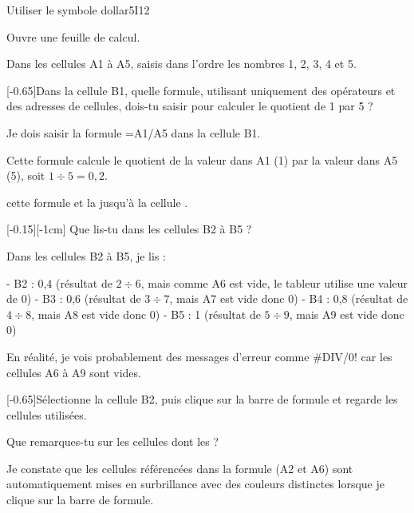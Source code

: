 \def\points{4}
\def\rdifficulty{2}
\newpage
\begin{EXO}{Utiliser le symbole dollar}{5I12}
\begin{MultiColonnes}{2}
\tcbitem[raster multicolumn=2]
    \begin{tcbenumerate}[1]
        \tcbitem {}Ouvre une feuille de calcul. 
        
        Dans les cellules A1 à A5, saisis dans l'ordre les nombres 1, 2, 3, 4 et 5.
       
        \tcbitem {}[-0.65]Dans la cellule B1, quelle formule, utilisant uniquement des opérateurs et des adresses de cellules, dois-tu saisir pour calculer le quotient de 1 par 5 ?
        \begin{crep}[extra lines=1]
        Je dois saisir la formule =A1/A5 dans la cellule B1.
        
        Cette formule calcule le quotient de la valeur dans A1 (1) par la valeur dans A5 (5), soit $1 \div 5 = 0{,}2$.
        \end{crep}
    \end{tcbenumerate}

\tcbitem[raster multicolumn=2]
    \begin{tcbenumerate}[1][3]
        \tcbitem {} cette formule et  la  jusqu'à la cellule . 
        
        [-0.15][-1cm] Que lis-tu dans les cellules B2 à B5 ?
        \begin{crep}[extra lines=2]
        Dans les cellules B2 à B5, je lis :
        
        - B2 : 0,4 (résultat de $2 \div 6$, mais comme A6 est vide, le tableur utilise une valeur de 0)
        - B3 : 0,6 (résultat de $3 \div 7$, mais A7 est vide donc 0)
        - B4 : 0,8 (résultat de $4 \div 8$, mais A8 est vide donc 0)
        - B5 : 1 (résultat de $5 \div 9$, mais A9 est vide donc 0)
        
        En réalité, je vois probablement des messages d'erreur comme \#DIV/0! car les cellules A6 à A9 sont vides.
        \end{crep}
        
        \tcbitem {}[-0.65]Sélectionne la cellule B2, puis clique sur la barre de formule et regarde les cellules utilisées. 
        
        Que remarques-tu sur les cellules dont les  ?
        \begin{crep}[extra lines=1]
        Je constate que les cellules référencées dans la formule (A2 et A6) sont automatiquement mises en surbrillance avec des couleurs distinctes lorsque je clique sur la barre de formule.
        

\end{crep}
\end{tcbenumerate}
\end{MultiColonnes}
\end{EXO}

